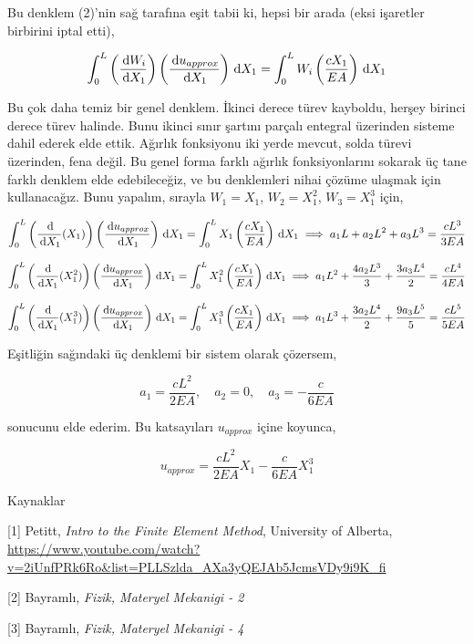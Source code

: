 \documentclass[12pt,fleqn]{article}\usepackage{../../common}
\begin{document}
Bu denklem (2)'nin sağ tarafına eşit tabii ki, hepsi bir arada (eksi
işaretler birbirini iptal etti),

$$
\int_{0}^{L} \left( \frac{\,\mathrm{d} W_i}{\,\mathrm{d} X_1}  \right)
\left( \frac{\,\mathrm{d} u_{approx}}{\,\mathrm{d} X_1}\right) \,\mathrm{d} X_1 =
\int_{0}^{L} W_i  \left( \frac{c X_1}{EA} \right) \,\mathrm{d} X_1
$$

Bu çok daha temiz bir genel denklem. İkinci derece türev kayboldu, herşey
birinci derece türev halinde. Bunu ikinci sınır şartını parçalı entegral
üzerinden sisteme dahil ederek elde ettik. Ağırlık fonksiyonu iki yerde mevcut,
solda türevi üzerinden, fena değil. Bu genel forma farklı ağırlık
fonksiyonlarını sokarak üç tane farklı denklem elde edebileceğiz, ve bu
denklemleri nihai çözüme ulaşmak için kullanacağız. Bunu yapalım, sırayla
$W_1 = X_1$, $W_2 = X_1^2$, $W_3 = X_1^3$ için,

$$
\int_{0}^{L} \left( \frac{\,\mathrm{d}}{\,\mathrm{d} X_1} (X_1) \right)
\left( \frac{\,\mathrm{d} u_{approx}}{\,\mathrm{d} X_1}\right) \,\mathrm{d} X_1 =
\int_{0}^{L} X_1  \left( \frac{c X_1}{EA} \right) \,\mathrm{d} X_1
\implies a_1 L + a_2 L^2 + a_3 L^3 = \frac{c L^3}{3EA}
$$

$$
\int_{0}^{L} \left( \frac{\,\mathrm{d}}{\,\mathrm{d} X_1} (X_1^2) \right)
\left( \frac{\,\mathrm{d} u_{approx}}{\,\mathrm{d} X_1}\right) \,\mathrm{d} X_1 =
\int_{0}^{L} X_1^2  \left( \frac{c X_1}{EA} \right) \,\mathrm{d} X_1
\implies a_1 L^2 + \frac{4 a_2 L^3}{3} + \frac{3 a_3 L^4}{2} = \frac{cL^4}{4EA}
$$

$$
\int_{0}^{L} \left( \frac{\,\mathrm{d}}{\,\mathrm{d} X_1} (X_1^3) \right)
\left( \frac{\,\mathrm{d} u_{approx}}{\,\mathrm{d} X_1}\right) \,\mathrm{d} X_1 =
\int_{0}^{L} X_1^3  \left( \frac{c X_1}{EA} \right) \,\mathrm{d} X_1
\implies a_1 L^3 + \frac{3 a_2 L^4}{2} + \frac{9 a_3 L^5}{5} = \frac{cL^5}{5EA}
$$

Eşitliğin sağındaki üç denklemi bir sistem olarak çözersem,

$$
a_1 = \frac{c L^2}{2EA}, \quad a_2 = 0, \quad a_3 = -\frac{c}{6EA}
$$

sonucunu elde ederim. Bu katsayıları $u_{approx}$ içine koyunca,

$$
u_{approx} = \frac{c L^2}{2EA} X_1 -\frac{c}{6EA} X_1^3
$$

Kaynaklar

[1] Petitt, {\em Intro to the Finite Element Method}, University of Alberta,
    \url{https://www.youtube.com/watch?v=2iUnfPRk6Ro&list=PLLSzlda_AXa3yQEJAb5JcmsVDy9i9K_fi}

[2] Bayramlı, {\em Fizik, Materyel Mekanigi - 2}
    
[3] Bayramlı, {\em Fizik, Materyel Mekanigi - 4}
    
\end{document}
